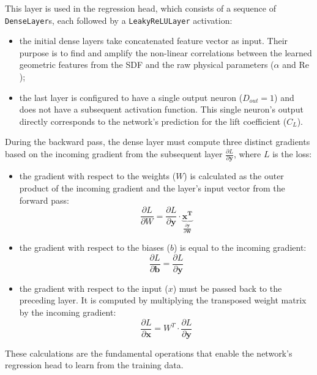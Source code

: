 This layer is used in the regression head, which consists of a sequence of \texttt{DenseLayer}s, each followed by a \texttt{LeakyReLULayer} activation:
\begin{itemize}
    \item[-] the initial dense layers take concatenated feature vector as input. Their purpose is to find and amplify the non-linear correlations between the learned geometric features from the SDF and the raw physical parameters ($\alpha$ and $\mathrm{Re}$);
    \item[-] the last layer is configured to have a single output neuron ($D_{out}=1$) and does not have a subsequent activation function. This single neuron's output directly corresponds to the network's prediction for the lift coefficient ($C_L$).
\end{itemize}
\vspace{2ex}
During the backward pass, the dense layer must compute three distinct gradients based on the incoming gradient from the subsequent layer $\frac{\partial L}{\partial \mathbf y}$, where $L$ is the loss:
\begin{itemize}
    \item[-] the gradient with respect to the weights ($W$) is calculated as the outer product of the incoming gradient and the layer's input vector from the forward pass:
    \begin{equation}
        \frac{\partial L}{\partial W}=\frac{\partial L}{\partial \mathbf y}\cdot \underbrace{\mathbf{x^T}}_{\frac{\partial\mathbf{y}}{\partial\mathbf{W}}}
    \end{equation}
    \item[-] the gradient with respect to the biases ($b$) is equal to the incoming gradient:
    \begin{equation}
        \frac{\partial L}{\partial \mathbf b}=\frac{\partial L}{\partial \mathbf y}
    \end{equation}
    \item[-] the gradient with respect to the input ($x$) must be passed back to the preceding layer. It is computed by multiplying the transposed weight matrix by the incoming gradient:
    \begin{equation}
        \frac{\partial L}{\partial \mathbf x}=W^T\cdot\frac{\partial L}{\partial \mathbf y}
    \end{equation}
\end{itemize}
These calculations are the fundamental operations that enable the network's regression head to learn from the training data.

